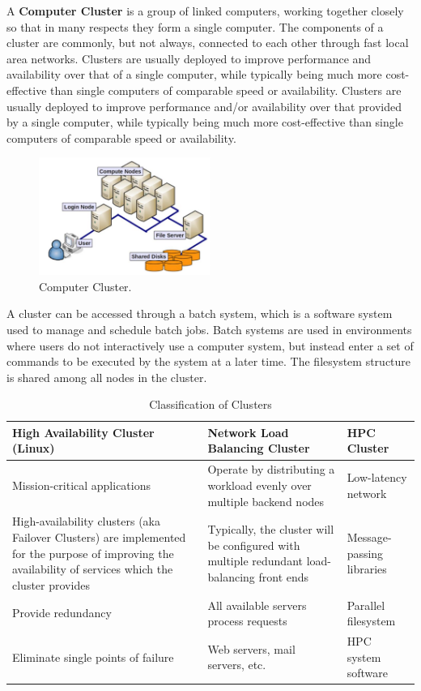A \textbf{Computer Cluster} is a group of linked computers, working together closely so that in many respects they form a single computer. The components of a cluster are commonly, but not always, connected to each other through fast local area networks. Clusters are usually deployed to improve performance and availability over that of a single computer, while typically being much more cost-effective than single computers of comparable speed or availability. Clusters are usually deployed to improve performance and/or availability over that provided by a single computer, while typically being much more cost-effective than single computers of comparable speed or availability.
\begin{figure}[H]
    \centering
    \includegraphics[width=0.5\textwidth]{assets/fig5.png}
    \caption{Computer Cluster.}
    \label{fig:5}
\end{figure}

A cluster can be accessed through a batch system, which is a software system used to manage and schedule batch jobs. Batch systems are used in environments where users do not interactively use a computer system, but instead enter a set of commands to be executed by the system at a later time. The filesystem structure is shared among all nodes in the cluster.

\begin{table}[H]
    \centering
    \begin{tabular}{|p{5cm}|p{5cm}|p{5cm}|} 
    \hline
    \textbf{High Availability Cluster (Linux)} & \textbf{Network Load Balancing Cluster} & \textbf{HPC Cluster} \\ 
    \hline
    Mission-critical applications & Operate by distributing a workload evenly over multiple backend nodes & Low-latency network \\ 
    \hline
    High-availability clusters (aka Failover Clusters) are implemented for the purpose of improving the availability of services which the cluster provides & Typically, the cluster will be configured with multiple redundant load-balancing front ends & Message-passing libraries \\ 
    \hline
    Provide redundancy & All available servers process requests & Parallel filesystem \\ 
    \hline
    Eliminate single points of failure & Web servers, mail servers, etc. & HPC system software \\ 
    \hline
    \end{tabular}
    \caption{Classification of Clusters}
    \label{tab:cluster-classification}
\end{table}

